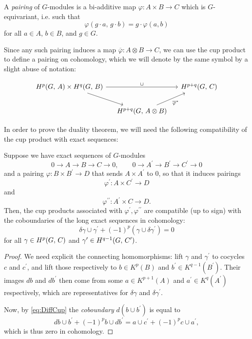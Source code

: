 \documentclass[a4paper, oneside]{memoir}
\begin{document}
\begin{definition}
	A \textit{pairing} of $G$-modules is a bi-additive map $\varphi: A\times B\to C$ which is $G$-equivariant, i.e. such that
	\[
		\varphi(g\cdot a,\,g\cdot b)=g\cdot\varphi(a,b)
	\]
	for all $a\in A$, $b\in B$, and $g\in G$.
\end{definition}

Since any such pairing induces a map $\overline{\varphi}: A\otimes B\to C$, we can use the cup product to define a pairing on cohomology, which we will denote by the same symbol by a slight abuse of notation:

\[
	\begin{tikzcd}[column sep=small]
		{\H{p}{G}{A}\times\H{q}{G}{B}} \ar[rd] \ar[rr, "\cup"] && \H{p+q}{G}{C}\\
		& \H{p+q}{G}{A\otimes B} \ar[ru, swap, "\overline{\varphi}^*"]
	\end{tikzcd}
\]

In order to prove the duality theorem, we will need the following compatibility of the cup product with exact sequences:

\begin{proposition}\label{prop:CompatCupDiff}
	Suppose we have exact sequences of $G$-modules
	\[
		0\longrightarrow A\longrightarrow B\longrightarrow C\longrightarrow 0,\qquad
		0\longrightarrow A^{\prime}\longrightarrow B^{\prime}\longrightarrow C^{\prime}\longrightarrow 0
	\]
	and a pairing $\varphi: B\times B^{\prime} \to D$ that sends $A\times A^{\prime}$ to $0$, so that it induces pairings
	\[\varphi^{\prime} : A\times C^{\prime} \to D\]
	and
	\[\varphi^{\prime\prime} : A^{\prime} \times C \to D.\]
	Then, the cup products associated with $\varphi^{\prime}, \varphi^{\prime\prime}$ are compatible (up to sign) with the coboundaries of the long exact sequences in cohomology:
	\[
		\delta\gamma\cup\gamma^{\prime} +(-1)^p(\gamma\cup\delta\gamma^{\prime} )=0
	\]
	for all $\gamma\in H^{p}( G, \, C )$ and $\gamma^{\prime} \in H^{q-1}( G, \, C^{\prime} )$.
\end{proposition}

\begin{proof}
	We need explicit the connecting homomorphisms: lift $\gamma$ and $\gamma^{\prime} $ to cocycles $c$ and $c^{\prime}$, and lift those respectively to $b\in K^p(B)$ and $b^{\prime} \in K^{q-1}(B^{\prime} )$. Their images $db$ and $db^{\prime} $ then come from some $a\in K^{p+1}(A)$ and $a^{\prime} \in K^q(A^{\prime} )$ respectively, which are representatives for $\delta \gamma$ and $\delta \gamma^{\prime} $.

	Now, by \eqref{eq:DiffCup} the \textit{coboundary} $d(b\cup b^{\prime} )$ is equal to \[db\cup b^{\prime} +(-1)^p b\cup db^{\prime} = a\cup c^{\prime}  + (-1)^p c \cup
		a^{\prime},\] which is thus zero in cohomology.
\end{proof}
\end{document}
